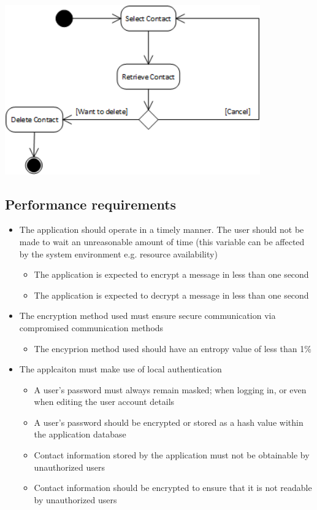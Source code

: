 \begin{itemize}
 \includegraphics[width=11cm]{diagrams/StateDiagrams/RemoveContactStateDiagram.png}
\end{itemize}

\subsection{Performance requirements}
\begin{itemize}
\item The application should operate in a timely manner. The user should not be made to wait an unreasonable amount of time (this variable can be affected by the system environment e.g. resource availability)
\begin{itemize}
\item The application is expected to encrypt a message in less than one second
\item The application is expected to decrypt a message in less than one second
\end{itemize}
\item The encryption method used must ensure secure communication via compromised communication methods
\begin{itemize}
\item The encyprion method used should have an entropy value of less than 1\%
\end{itemize}
\item The applcaiton must make use of local authentication
\begin{itemize}
\item A user's password must always remain masked; when logging in, or even when editing the user account details
\item A user's password should be encrypted or stored as a hash value within the application database
\item Contact information stored by the application must not be obtainable by unauthorized users
\item Contact information should be encrypted to ensure that it is not readable by unauthorized users
\end{itemize}
\end{itemize}


